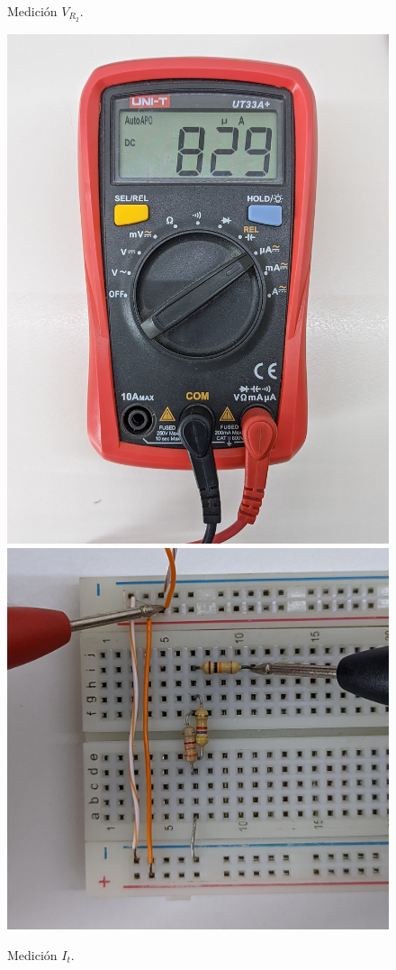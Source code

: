 \documentclass[a4paper,12pt, spanish]{report}
\begin{document}
\begin{figure}[H]
\begin{minipage}{0.3\textwidth}
            \caption{Medición $V_{R_2}$.}
          \end{minipage}
          \begin{minipage}{0.3\textwidth}
            \centering
            \includegraphics[width=1\linewidth]{pictures/mult-it.jpg}
            \includegraphics[width=1\linewidth]{pictures/prot-it.jpg}
            \caption{Medición $I_t$.}
          \end{minipage}
      \end{figure}
\end{document}
